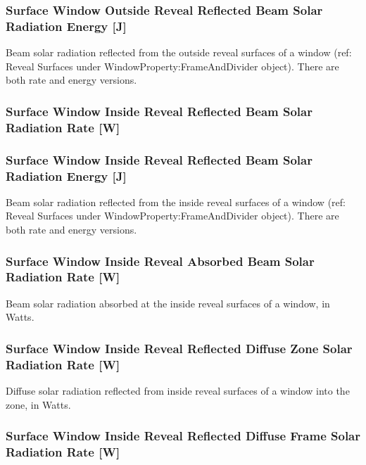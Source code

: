 \subsubsection{Surface Window Outside Reveal Reflected Beam Solar Radiation Energy {[}J{]}}\label{surface-window-outside-reveal-reflected-beam-solar-radiation-energy-j}

Beam solar radiation reflected from the outside reveal surfaces of a window (ref: Reveal Surfaces under WindowProperty:FrameAndDivider object). There are both rate and energy versions.

\subsubsection{Surface Window Inside Reveal Reflected Beam Solar Radiation Rate {[}W{]}}\label{surface-window-inside-reveal-reflected-beam-solar-radiation-rate-w}

\subsubsection{Surface Window Inside Reveal Reflected Beam Solar Radiation Energy {[}J{]}}\label{surface-window-inside-reveal-reflected-beam-solar-radiation-energy-j}

Beam solar radiation reflected from the inside reveal surfaces of a window (ref: Reveal Surfaces under WindowProperty:FrameAndDivider object). There are both rate and energy versions.

\subsubsection{Surface Window Inside Reveal Absorbed Beam Solar Radiation Rate {[}W{]}}\label{surface-window-inside-reveal-absorbed-beam-solar-radiation-rate-w}

Beam solar radiation absorbed at the inside reveal surfaces of a window, in Watts.

\subsubsection{Surface Window Inside Reveal Reflected Diffuse Zone Solar Radiation Rate {[}W{]}}\label{surface-window-inside-reveal-reflected-diffuse-zone-solar-radiation-rate-w}

Diffuse solar radiation reflected from inside reveal surfaces of a window into the zone, in Watts.

\subsubsection{Surface Window Inside Reveal Reflected Diffuse Frame Solar Radiation Rate {[}W{]}}\label{surface-window-inside-reveal-reflected-diffuse-frame-solar-radiation-rate-w}

